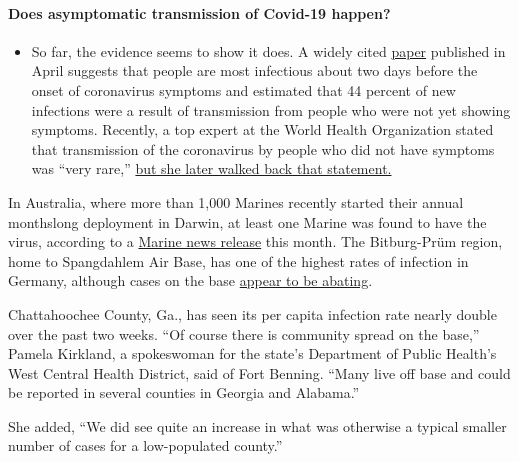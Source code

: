 \begin{itemize}
{  \paragraph{Does asymptomatic transmission of Covid-19
  happen?}\label{does-asymptomatic-transmission-of-covid-19-happen}}

  \begin{itemize}
  \tightlist
  \item
    So far, the evidence seems to show it does. A widely cited
    \href{https://www.nature.com/articles/s41591-020-0869-5}{paper}
    published in April suggests that people are most infectious about
    two days before the onset of coronavirus symptoms and estimated that
    44 percent of new infections were a result of transmission from
    people who were not yet showing symptoms. Recently, a top expert at
    the World Health Organization stated that transmission of the
    coronavirus by people who did not have symptoms was ``very rare,''
    \href{https://www.nytimes.com/2020/06/09/world/coronavirus-updates.html?action=click\&pgtype=Article\&state=default\&region=MAIN_CONTENT_3\&context=storylines_faq\#link-1f302e21}{but
    she later walked back that statement.}
  \end{itemize}
\end{itemize}

In Australia, where more than 1,000 Marines recently started their
annual monthslong deployment in Darwin, at least one Marine was found to
have the virus, according to a
\href{https://www.dvidshub.net/news/373660/confirmed-positive-case-covid-19-mrf-d-marine}{Marine
news release} this month. The Bitburg-Prüm region, home to Spangdahlem
Air Base, has one of the highest rates of infection in Germany, although
cases on the base
\href{https://www.spangdahlem.af.mil/Portals/10/2019\%20Novel\%20Corona\%20virus\%20\%28COVID-19\%29\%20HPCON\%20A_\%20PHASE\%203\%20Guidance.pdf}{appear
to be abating}.

Chattahoochee County, Ga., has seen its per capita infection rate nearly
double over the past two weeks. ``Of course there is community spread on
the base,'' Pamela Kirkland, a spokeswoman for the state's Department of
Public Health's West Central Health District, said of Fort Benning.
``Many live off base and could be reported in several counties in
Georgia and Alabama.''

She added, ``We did see quite an increase in what was otherwise a
typical smaller number of cases for a low-populated county.''

